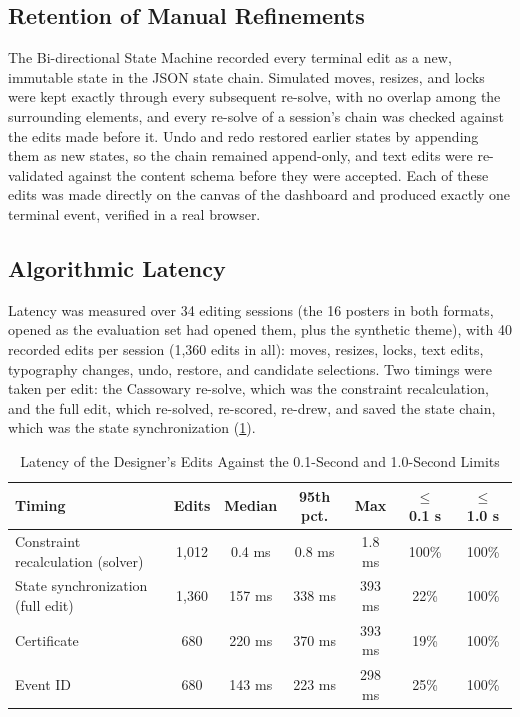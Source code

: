 \begin{refsection}
\subsection{Retention of Manual Refinements}

The Bi-directional State Machine recorded every terminal edit as a new, immutable state in the JSON state chain. Simulated moves, resizes, and locks were kept exactly through every subsequent re-solve, with no overlap among the surrounding elements, and every re-solve of a session's chain was checked against the edits made before it. Undo and redo restored earlier states by appending them as new states, so the chain remained append-only, and text edits were re-validated against the content schema before they were accepted. Each of these edits was made directly on the canvas of the dashboard and produced exactly one terminal event, verified in a real browser.

\subsection{Algorithmic Latency}

Latency was measured over 34 editing sessions (the 16 posters in both formats, opened as the evaluation set had opened them, plus the synthetic theme), with 40 recorded edits per session (1,360 edits in all): moves, resizes, locks, text edits, typography changes, undo, restore, and candidate selections. Two timings were taken per edit: the Cassowary re-solve, which was the constraint recalculation, and the full edit, which re-solved, re-scored, re-drew, and saved the state chain, which was the state synchronization (\ref{tab:latency}).

\begin{table}[ht]
\centering
\caption{Latency of the Designer's Edits Against the 0.1-Second and 1.0-Second Limits}
\label{tab:latency}
\small
\begin{tabular}{l c c c c c c}
\hline
\textbf{Timing} & \textbf{Edits} & \textbf{Median} & \textbf{95th pct.} & \textbf{Max} & \textbf{$\leq$ 0.1 s} & \textbf{$\leq$ 1.0 s} \\ \hline
Constraint recalculation (solver) & 1,012 & 0.4 ms & 0.8 ms & 1.8 ms & 100\% & 100\% \\
State synchronization (full edit) & 1,360 & 157 ms & 338 ms & 393 ms & 22\% & 100\% \\
\quad Certificate & 680 & 220 ms & 370 ms & 393 ms & 19\% & 100\% \\
\quad Event ID & 680 & 143 ms & 223 ms & 298 ms & 25\% & 100\% \\ \hline
\end{tabular}
\end{table}


\end{refsection}
